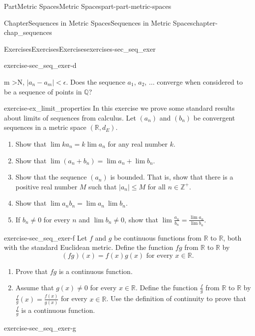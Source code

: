 \documentclass[oneside,10pt,]{book}
\numberwithin{equation}{chapter}
\newcommand{\Z}{\mathbb{Z}}
\newcommand{\Q}{\mathbb{Q}}
\newcommand{\R}{\mathbb{R}}
\newcommand{\lt}{<}
\newcommand{\gt}{>}
\begin{document}
\begin{partptx}{Part}{Metric Spaces}{}{Metric Spaces}{}{}{part-part-metric-spaces}
\begin{chapterptx}{Chapter}{Sequences in Metric Spaces}{}{Sequences in Metric Spaces}{}{}{chapter-chap_sequences}
\begin{exercises-section}{Exercises}{Exercises}{}{Exercises}{}{}{exercises-sec_seq_exer}
\begin{divisionexercise}{4}{}{}{exercise-sec_seq_exer-d}
\begin{enumerate}[font=\bfseries,label=(\alph*),ref=\alph*]
m \gt N\), \(|a_n - a_m | \lt \epsilon\). Does the sequence \(a_1\), \(a_2\), \(\ldots\) converge when considered to be a sequence of points in \(\Q\)?%
\end{enumerate}%
\end{divisionexercise}%
\begin{divisionexercise}{5}{}{}{exercise-ex_limit_properties}%
In this exercise we prove some standard results about limits of sequences from calculus. Let \((a_n)\) and \((b_n)\) be convergent sequences in a metric space \((\R,d_E)\).%
\begin{enumerate}[font=\bfseries,label=(\alph*),ref=\alph*]%
\item{}Show that \(\lim ka_n = k \lim a_n\) for any real number \(k\).%
\item{}Show that \(\lim (a_n + b_n) = \lim a_n + \lim b_n\).%
\item{}Show that the sequence \((a_n)\) is bounded. That is, show that there is a positive real number \(M\) such that \(|a_n| \leq M\) for all \(n \in \Z^+\).%
\item{}Show that \(\lim a_nb_n = \lim a_n \ \lim b_n\).%
\item{}If \(b_n \neq 0\) for every \(n\) and \(\lim b_n \neq 0\), show that \(\lim \frac{a_n}{b_n} = \frac{\lim a_n}{\lim b_n}\).%
\end{enumerate}%
\end{divisionexercise}%
\begin{divisionexercise}{6}{}{}{exercise-sec_seq_exer-f}%
Let \(f\) and \(g\) be continuous functions from \(\R\) to \(\R\), both with the standard Euclidean metric. Define the function \(fg\) from \(\R\) to \(\R\) by%
\begin{equation*}
(fg)(x) = f(x)g(x) \text{ for every }  x \in \R\text{.}
\end{equation*}
%
\begin{enumerate}[font=\bfseries,label=(\alph*),ref=\alph*]%
\item{}Prove that \(fg\) is a continuous function.%
\item{}Assume that \(g(x) \neq 0\) for every \(x \in \R\). Define the function \(\frac{f}{g}\) from \(\R\) to \(\R\) by \(\frac{f}{g}(x) = \frac{f(x)}{g(x)}\) for every \(x \in \R\). Use the definition of continuity to prove that \(\frac{f}{g}\) is a continuous function.%
\end{enumerate}%
\end{divisionexercise}%
\begin{divisionexercise}{7}{}{}{exercise-sec_seq_exer-g}%

\end{divisionexercise}
\end{exercises-section}
\end{chapterptx}
\end{partptx}
\end{document}

